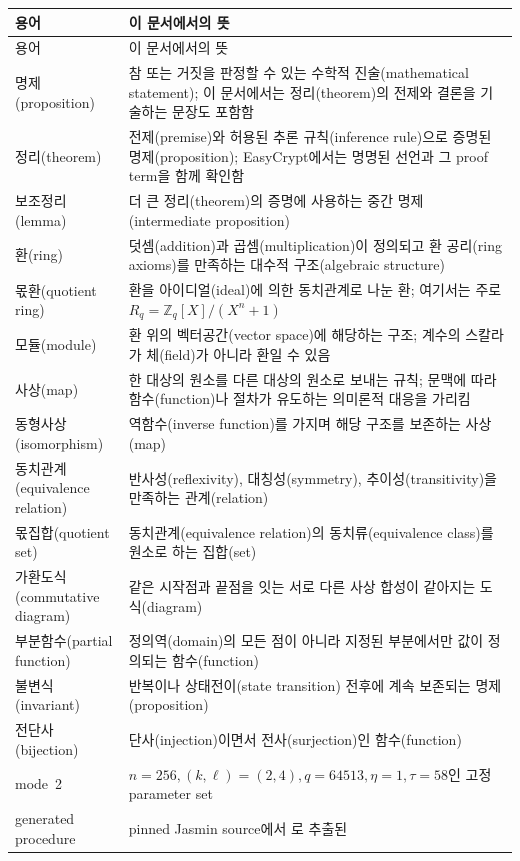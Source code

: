 \begin{longtable}{L{37mm} L{110mm}}
\toprule
용어 & 이 문서에서의 뜻 \\
\midrule
\endfirsthead
\toprule
용어 & 이 문서에서의 뜻 \\
\midrule
\endhead
명제(proposition) & 참 또는 거짓을 판정할 수 있는 수학적 진술(mathematical
statement); 이 문서에서는 정리(theorem)의 전제와 결론을 기술하는 문장도 포함함 \\
정리(theorem) & 전제(premise)와 허용된 추론 규칙(inference rule)으로 증명된
명제(proposition); EasyCrypt에서는 명명된 선언과 그 proof term을 함께 확인함 \\
보조정리(lemma) & 더 큰 정리(theorem)의 증명에 사용하는 중간
명제(intermediate proposition) \\
환(ring) & 덧셈(addition)과 곱셈(multiplication)이 정의되고 환 공리(ring axioms)를
만족하는 대수적 구조(algebraic structure) \\
몫환(quotient ring) & 환을 아이디얼(ideal)에 의한 동치관계로 나눈 환; 여기서는
주로 \(R_q=\mathbb Z_q[X]/(X^n+1)\) \\
모듈(module) & 환 위의 벡터공간(vector space)에 해당하는 구조; 계수의 스칼라가
체(field)가 아니라 환일 수 있음 \\
사상(map) & 한 대상의 원소를 다른 대상의 원소로 보내는 규칙; 문맥에 따라
함수(function)나 절차가 유도하는 의미론적 대응을 가리킴 \\
동형사상(isomorphism) & 역함수(inverse function)를 가지며 해당 구조를 보존하는
사상(map) \\
동치관계(equivalence relation) & 반사성(reflexivity), 대칭성(symmetry),
추이성(transitivity)을 만족하는 관계(relation) \\
몫집합(quotient set) & 동치관계(equivalence relation)의 동치류(equivalence class)를
원소로 하는 집합(set) \\
가환도식(commutative diagram) & 같은 시작점과 끝점을 잇는 서로 다른 사상 합성이
같아지는 도식(diagram) \\
부분함수(partial function) & 정의역(domain)의 모든 점이 아니라 지정된 부분에서만
값이 정의되는 함수(function) \\
불변식(invariant) & 반복이나 상태전이(state transition) 전후에 계속 보존되는
명제(proposition) \\
전단사(bijection) & 단사(injection)이면서 전사(surjection)인 함수(function) \\
mode~2 & \(n=256,(k,\ell)=(2,4),q=64513,\eta=1,\tau=58\)인 고정 parameter set \\
generated procedure & pinned Jasmin source에서 로 추출된

\end{longtable}

